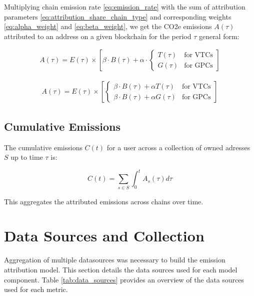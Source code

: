 \documentclass[11pt]{report}
\begin{document}
Multiplying chain emission rate \eqref{eq:emission_rate} with the sum of attribution parameters \eqref{eq:attribution_share_chain_type} and corresponding weights \eqref{eq:alpha_weight} and \eqref{eq:beta_weight}, we get the CO2e emissions \(A(\tau)\) attributed to an address on a given blockchain for the period $\tau$ general form:


\begin{align}
    A(\tau) = E(\tau) \times \left[\beta \cdot B(\tau) + \alpha \cdot \begin{cases}
                                                                              T(\tau) & \text{for VTCs} \\
                                                                              G(\tau) & \text{for GPCs}
                                                                          \end{cases}\right]
\end{align}

\begin{align}
    A(\tau) = E(\tau) \times \left[\begin{cases}
                                           \beta \cdot B(\tau) + \alpha T(\tau)  & \text{for VTCs} \\
                                           \beta \cdot B(\tau) +  \alpha G(\tau) & \text{for GPCs}
                                       \end{cases}\right]
\end{align}

\subsection*{Cumulative Emissions}

The cumulative emissions $C(t)$ for a user across a collection of owned adresses $S$ up to time $\tau$ is:

\begin{equation}
    C(t) = \sum_{s \in S} \int_{0}^{t} A_s(\tau) d\tau
\end{equation}

This aggregates the attributed emissions across chains over time.

\section{Data Sources and Collection}

Aggregation of multiple datasources was necessary to build the emission attribution model. This section details the data sources used for each model component. Table \ref{tab:data_sources} provides an overview of the data sources used for each metric.
\end{document}
